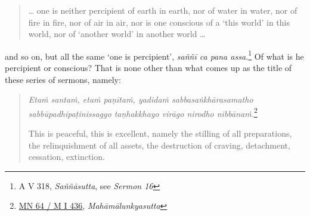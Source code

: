 \begin{quote}
\ldots{} one is neither percipient of earth in earth, nor of water in water, nor of fire in fire, nor of air in air, nor is one conscious of a `this world' in this world, nor of `another world' in another world \ldots{}
\end{quote}

and so on, but all the same `one is percipient', \emph{saññī ca pana assa.}\footnote{A V 318, \emph{Saññāsutta}, see \emph{Sermon 16}} Of what is he percipient or conscious? That is none other than what comes up as the title of these series of sermons, namely:

\begin{quote}
\emph{Etaṁ santaṁ, etaṁ paṇītaṁ, yadidaṁ sabbasaṅkhārasamatho sabbūpadhipaṭinissaggo taṇhakkhayo virāgo nirodho nibbānaṁ.}\footnote{\href{https://suttacentral.net/mn64/pli/ms}{MN 64 / M I 436}, \emph{Mahāmālunkyasutta}}

This is peaceful, this is excellent, namely the stilling of all preparations, the relinquishment of all assets, the destruction of craving, detachment, cessation, extinction.
\end{quote}
